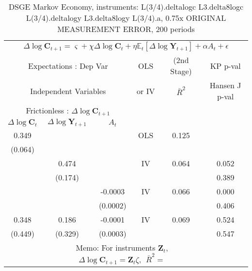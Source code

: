 \begin{table}\caption{DSGE Markov Economy, instruments: L(3/4).deltalogc L3.delta8logc L(3/4).deltalogy L3.delta8logy L(3/4).a, 0.75x ORIGINAL MEASUREMENT ERROR, 200 periods}
\begin{tabular}{cccccc}
 \hline \hline\multicolumn{6}{c}{$ \Delta \log \mathbf{C}_{t+1} = \varsigma + \chi \Delta \log \mathbf{C}_t + \eta \mathbb{E}_t[\Delta \log \mathbf{Y}_{t+1}] + \alpha A_t + \epsilon $ } 
\\ \multicolumn{3}{c}{Expectations : Dep Var} & OLS &  (2nd Stage) & KP p-val 
\\ \multicolumn{3}{c}{Independent Variables} & or IV & $ \bar{R}^{2} $ & Hansen J p-val 
\\ \hline \multicolumn{3}{c}{Frictionless : $\Delta \log \mathbf{C}_{t+1}$} & & & 
\\ \multicolumn{1}{c}{$\Delta \log \mathbf{C}_{t} $} & \multicolumn{1}{c}{$\Delta \log \mathbf{Y}_{t+1}$}& \multicolumn{1}{c}{$ A_{t}  $} & & & 
\\ 0.349 & & & OLS & 0.125& 
\\ (0.064) & & & & & 
\\ & 0.474 & & IV & 0.064 & 0.052
\\ & (0.174) & & & & 0.389
\\ & & -0.0003 & IV & 0.066 & 0.000
\\ & & (0.0002) & & & 0.406
\\ 0.348 & 0.186 & -0.0001 & IV & 0.069 & 0.524
\\ (0.449) & (0.329) & (0.0003) & & & 0.547
\\ & \multicolumn{4}{c}{Memo: For instruments $\mathbf{Z}_{t}$,  $\Delta \log \mathbf{C}_{t+1} = \mathbf{Z}_{t} \zeta,~~\bar{R}^{2}=$ } 0.074 & 
\\ \hline \hline 
\end{tabular} 
\end{table} 
\newpage 
